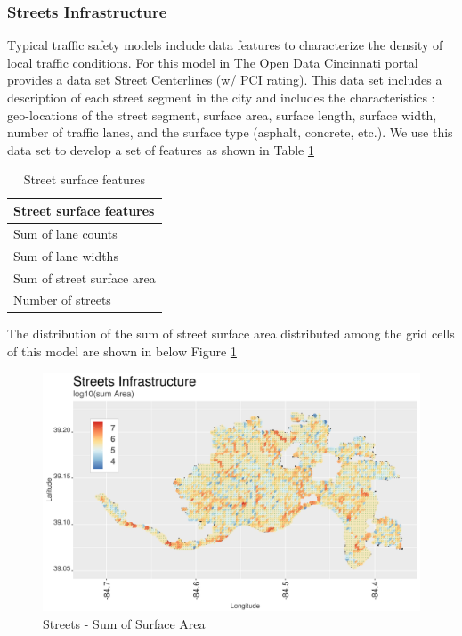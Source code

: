 \documentclass{llncs}
\begin{document}

\subsubsection{Streets Infrastructure}

Typical traffic safety models include data features to characterize the density of local traffic conditions. For this model in The Open Data Cincinnati portal provides a data set Street Centerlines (w/ PCI rating). This data set includes a description of each street segment in the city and includes the characteristics : geo-locations of the street segment, surface area, surface length, surface width, number of traffic lanes, and the surface type (asphalt, concrete, etc.). We use this data set to develop a set of features as shown in Table \ref{table : streetFeatures}

\FloatBarrier
\begin{table}[!h]
\begin{center}
\caption{Street surface features}
\label{table : streetFeatures}
\begin{tabular}{ p{}}
\hline
\rule{0pt}{12pt}
Street surface features\\[2pt]
\hline
Sum of lane counts\\
Sum of lane widths\\
Sum of street surface area\\
Number of streets\\[2pt]
\hline
\end{tabular}
\end{center}
\end{table}
\FloatBarrier
%

The distribution of the sum of street surface area distributed among the grid cells of this model are shown in below Figure \ref{figure : streetsSumArea}

\FloatBarrier
\begin{figure}
 	\includegraphics[width=\textwidth, height=\textheight, keepaspectratio]{streetsSumArea}
 	\caption{Streets - Sum of Surface Area}
	\label{figure : streetsSumArea}
\end{figure}
\FloatBarrier
\end{document}

